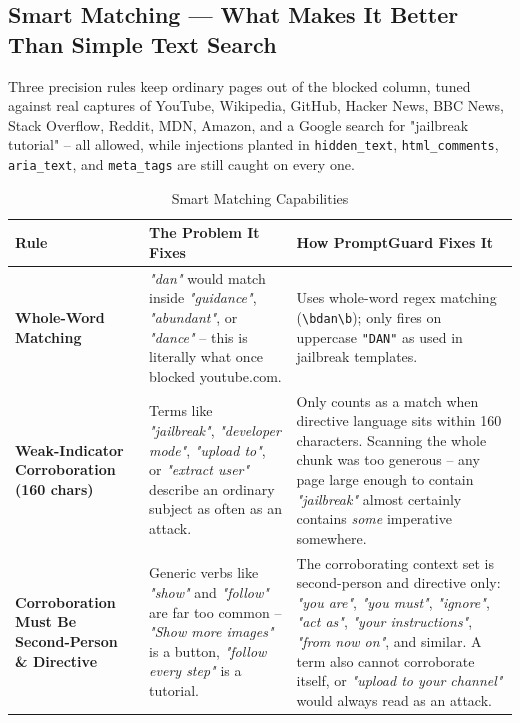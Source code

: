 \documentclass[11pt,a4paper]{article}
\begin{document}
\subsection{Smart Matching --- What Makes It Better Than Simple Text Search}

Three precision rules keep ordinary pages out of the blocked column, tuned against real captures of YouTube, Wikipedia, GitHub, Hacker News, BBC News, Stack Overflow, Reddit, MDN, Amazon, and a Google search for "jailbreak tutorial" -- all allowed, while injections planted in \texttt{hidden\_text}, \texttt{html\_comments}, \texttt{aria\_text}, and \texttt{meta\_tags} are still caught on every one.

\begin{table}[H]
\centering
\small
\begin{tabularx}{\textwidth}{BXX}
\toprule
\textbf{Rule} & \textbf{The Problem It Fixes} & \textbf{How PromptGuard Fixes It} \\
\midrule
\textbf{Whole-Word Matching} & \textit{"dan"} would match inside \textit{"guidance"}, \textit{"abundant"}, or \textit{"dance"} -- this is literally what once blocked youtube.com. & Uses whole-word regex matching (\texttt{\textbackslash bdan\textbackslash b}); only fires on uppercase \texttt{"DAN"} as used in jailbreak templates. \\
\textbf{Weak-Indicator Corroboration (160 chars)} & Terms like \textit{"jailbreak"}, \textit{"developer mode"}, \textit{"upload to"}, or \textit{"extract user"} describe an ordinary subject as often as an attack. & Only counts as a match when directive language sits within 160 characters. Scanning the whole chunk was too generous -- any page large enough to contain \textit{"jailbreak"} almost certainly contains \emph{some} imperative somewhere. \\
\textbf{Corroboration Must Be Second-Person \& Directive} & Generic verbs like \textit{"show"} and \textit{"follow"} are far too common -- \textit{"Show more images"} is a button, \textit{"follow every step"} is a tutorial. & The corroborating context set is second-person and directive only: \textit{"you are"}, \textit{"you must"}, \textit{"ignore"}, \textit{"act as"}, \textit{"your instructions"}, \textit{"from now on"}, and similar. A term also cannot corroborate itself, or \textit{"upload to your channel"} would always read as an attack. \\
\bottomrule
\end{tabularx}
\caption{Smart Matching Capabilities}
\end{table}
\end{document}
